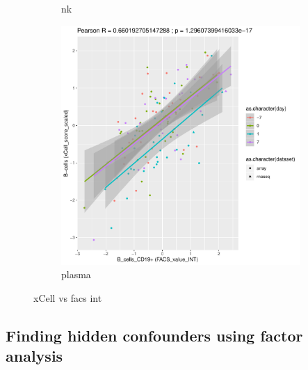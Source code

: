 \begin{figure}
\begin{subfigure}[b]{0.43\textwidth}
        \caption{nk}
    \end{subfigure}%
    \vspace{1em}\vfill%
    \begin{subfigure}[b]{0.43\textwidth}
        \centering
        \includegraphics[width=1.0\textwidth,page=2]{mainmatter/figures/chapter_03/validate_xCell_estimates.cell_type_pairs.pdf}
        \caption{plasma}
    \end{subfigure}%
    \caption{xCell vs facs int}
    \label{fig:hird_xCell_vs_FACS}
\end{figure}

\subsection{Finding hidden confounders using factor analysis}

%

